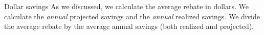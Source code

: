 \documentclass[8pt]{beamer}
\begin{document}
\begin{frame}{Dollar savings}
	As we discussed, we calculate the average rebate in dollars. We calculate the \textit{annual} projected savings and the \textit{annual} realized savings. We divide the average rebate by the average annual savings (both realized and projected).	
	
	
\end{frame}
\end{document}
